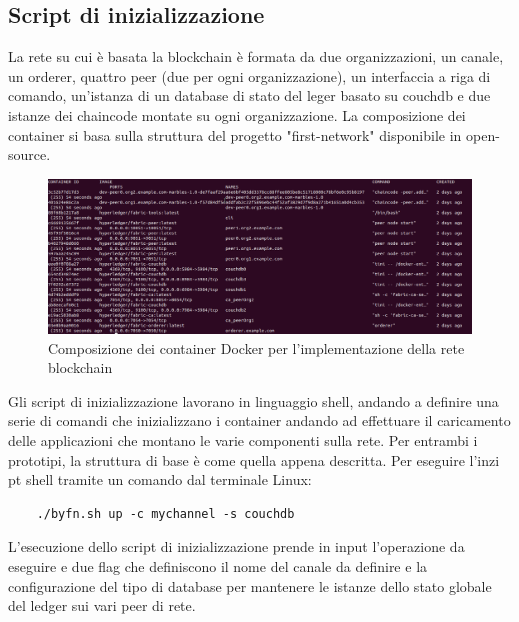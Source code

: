 \subsection{Script di inizializzazione}
La rete su cui è basata la blockchain è formata da due organizzazioni, un canale, un orderer, quattro peer (due per ogni organizzazione), un interfaccia a riga di comando, un'istanza di un database di stato del leger basato su couchdb e due istanze dei chaincode montate su ogni organizzazione. La composizione dei container si basa sulla struttura del progetto "first-network" disponibile in open-source. 
\begin{figure}[h]
    \centering
    \includegraphics[width=1\textwidth]{img/docker-impl.png}
    \caption{Composizione dei container Docker per l'implementazione della rete blockchain}
    \label{fig:docker-impl}
\end{figure}
Gli script di inizializzazione lavorano in linguaggio shell, andando a definire una serie di comandi che inizializzano i container andando ad effettuare il caricamento delle applicazioni che montano le varie componenti sulla rete. 
Per entrambi i prototipi, la struttura di base è come quella appena descritta. Per eseguire l'inzi pt shell tramite un comando dal terminale Linux: 
\begin{verbatim}
    ./byfn.sh up -c mychannel -s couchdb
\end{verbatim}
L'esecuzione dello script di inizializzazione prende in input l'operazione da eseguire e due flag che definiscono il nome del canale da definire e la configurazione del tipo di database per mantenere le istanze dello stato globale del ledger sui vari peer di rete.
